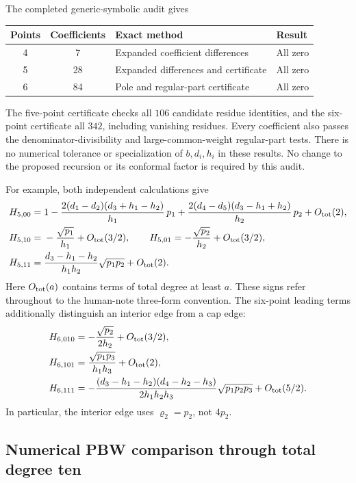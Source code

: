 \documentclass[11pt]{article}
\numberwithin{equation}{section}
\begin{document}
The completed generic-symbolic audit gives
\begin{center}
\begin{tabular}{@{}ccll@{}}
\toprule
Points & Coefficients & Exact method & Result\\
\midrule
4 & 7 & Expanded coefficient differences & All zero\\
5 & 28 & Expanded differences and certificate & All zero\\
6 & 84 & Pole and regular-part certificate & All zero\\
\bottomrule
\end{tabular}
\end{center}
The five-point certificate checks all $106$ candidate residue identities,
and the six-point certificate all $342$, including vanishing residues.
Every coefficient also passes the denominator-divisibility and
large-common-weight regular-part tests. There is no numerical tolerance
or specialization of $b,d_i,h_i$ in these results. No change to the
proposed recursion or its conformal factor is required by this audit.

For example, both independent calculations give
\begin{align}
 H_{5,00}={}&1
 -\frac{2(d_1-d_2)(d_3+h_1-h_2)}{h_1}\,p_1
 +\frac{2(d_4-d_5)(d_3-h_1+h_2)}{h_2}\,p_2
 +O_{\rm tot}(2),\notag\\
 H_{5,10}={}&-\frac{\sqrt{p_1}}{h_1}+O_{\rm tot}(3/2),\qquad
 H_{5,01}=-\frac{\sqrt{p_2}}{h_2}+O_{\rm tot}(3/2),\notag\\
 H_{5,11}={}&\frac{d_3-h_1-h_2}{h_1h_2}\sqrt{p_1p_2}
                  +O_{\rm tot}(2).
 \label{eq:audit-leading-coefficients}
\end{align}
Here $O_{\rm tot}(a)$ contains terms of total degree at least $a$.
These signs refer throughout to the human-note three-form convention.
The six-point leading terms additionally distinguish an interior edge
from a cap edge:
\begin{align}
 H_{6,010}&=-\frac{\sqrt{p_2}}{2h_2}+O_{\rm tot}(3/2),\notag\\
 H_{6,101}&=\frac{\sqrt{p_1p_3}}{h_1h_3}+O_{\rm tot}(2),\notag\\
 H_{6,111}&=-\frac{(d_3-h_1-h_2)(d_4-h_2-h_3)}{2h_1h_2h_3}
              \sqrt{p_1p_2p_3}+O_{\rm tot}(5/2).
 \label{eq:audit-six-leading-coefficients}
\end{align}
In particular, the interior edge uses $\varrho_2=p_2$, not $4p_2$.

\subsection{Numerical PBW comparison through total degree ten}
\label{sec:PBW-numerical}
\end{document}

